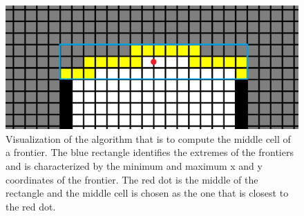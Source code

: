 \documentclass[a4paper,12pt]{article}
\begin{document}
				\begin{figure}[H]
					\centering
					\includegraphics[scale=0.25]{images/middleCellVisualization.png}
					\caption{Visualization of the algorithm that is to compute the middle cell of a frontier. The blue rectangle identifies the extremes of the frontiers and is characterized by the minimum and maximum x and y coordinates of the frontier. The red dot is the middle of the rectangle and the middle cell is chosen as the one that is closest to the red dot.}
					\label{middleCellVisualization}
				\end{figure}
\end{document}
